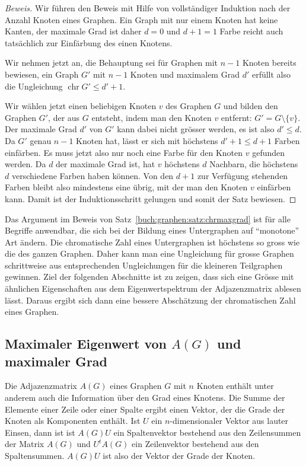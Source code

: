 \begin{proof}[Beweis]
Wir führen den Beweis mit Hilfe von vollständiger Induktion nach der
Anzahl Knoten eines Graphen.
Ein Graph mit nur einem Knoten hat keine Kanten, der maximale Grad ist
daher $d=0$ und $d+1=1$ Farbe reicht auch tatsächlich zur Einfärbung des
einen Knotens.

Wir nehmen jetzt an, die Behauptung sei für Graphen mit $n-1$ Knoten bereits
bewiesen, ein Graph $G'$ mit $n-1$ Knoten und maximalem Grad $d'$ erfüllt
also die Ungleichung $\operatorname{chr}G'\le d'+1$.

Wir wählen jetzt einen beliebigen Knoten $v$ des Graphen $G$ und bilden
den Graphen $G'$, der aus $G$ entsteht, indem man den Knoten $v$
entfernt: $G'=G\setminus\{v\}$.
Der maximale Grad $d'$ von $G'$ kann dabei nicht grösser werden, es ist
also $d'\le d$.
Da $G'$ genau $n-1$ Knoten hat, lässt er sich mit höchstens $d'+1\le d+1$
Farben einfärben.
Es muss jetzt also nur noch eine Farbe für den Knoten $v$ gefunden werden.
Da $d$ der maximale Grad ist, hat $v$ höchstens $d$ Nachbarn, die höchstens
$d$ verschiedene Farben haben können.
Von den $d+1$ zur Verfügung stehenden Farben bleibt also mindestens eine
übrig, mit der man den Knoten $v$ einfärben kann.
Damit ist der Induktionsschritt gelungen und somit der Satz bewiesen.
\end{proof}

Das Argument im Beweis von Satz~\ref{buch:graphen:satz:chrmaxgrad}
ist für alle Begriffe anwendbar, die sich bei der Bildung eines 
Untergraphen auf ``monotone'' Art ändern.
Die chromatische Zahl eines Untergraphen ist höchstens so gross wie die
des ganzen Graphen. 
Daher kann man eine Ungleichung für grosse Graphen schrittweise aus
entsprechenden Ungleichungen für die kleineren Teilgraphen gewinnen.
Ziel der folgenden Abschnitte ist zu zeigen, dass sich eine Grösse
mit ähnlichen Eigenschaften aus dem Eigenwertspektrum der Adjazenzmatrix
ablesen lässt.
Daraus ergibt sich dann eine bessere Abschätzung der chromatischen Zahl
eines Graphen.

%
%
\subsection{Maximaler Eigenwert von $A(G)$ und maximaler Grad
\label{buch:subsection:maximaler-eigenwert}}
Die Adjazenzmatrix $A(G)$ eines Graphen $G$  mit $n$ Knoten enthält unter
anderem auch die Information über den Grad eines Knotens.
Die Summe der Elemente einer Zeile oder einer Spalte ergibt einen Vektor,
der die Grade der Knoten als Komponenten enthält.
Ist $U$ ein $n$-dimensionaler Vektor aus lauter Einsen, dann ist
ist $A(G)U$ ein Spaltenvektor bestehend aus den Zeilensummen der Matrix 
$A(G)$ und
$U^tA(G)$ ein Zeilenvektor bestehend aus den Spaltensummen.
$A(G)U$ ist also der Vektor der Grade der Knoten.

